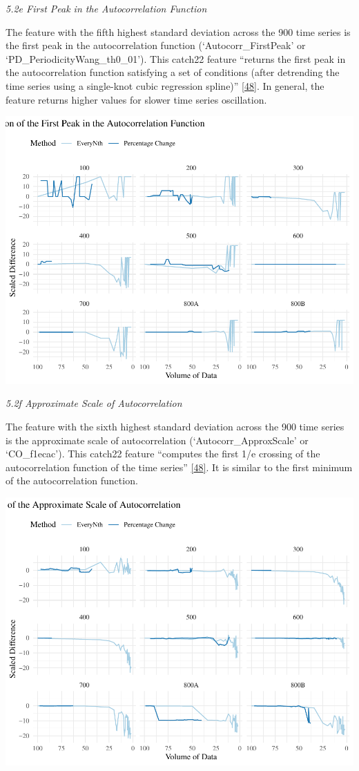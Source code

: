 \documentclass{article}
\begin{document}
\emph{5.2e First Peak in the Autocorrelation Function}

The feature with the fifth highest standard deviation across the 900
time series is the first peak in the autocorrelation function
(`Autocorr\_FirstPeak' or `PD\_PeriodicityWang\_th0\_01'). This catch22
feature ``returns the first peak in the autocorrelation function
satisfying a set of conditions (after detrending the time series using a
single-knot cubic regression spline)''
\protect\hyperlink{ref-feature_book}{{[}48{]}}. In general, the feature
returns higher values for slower time series oscillation.

\includegraphics{210431461_CSC8639_Dissertation_files/figure-latex/FirstPeak-1.pdf}

\emph{5.2f Approximate Scale of Autocorrelation}

The feature with the sixth highest standard deviation across the 900
time series is the approximate scale of autocorrelation
(`Autocorr\_ApproxScale' or `CO\_f1ecac'). This catch22 feature
``computes the first 1/e crossing of the autocorrelation function of the
time series'' \protect\hyperlink{ref-feature_book}{{[}48{]}}. It is
similar to the first minimum of the autocorrelation function.

\includegraphics{210431461_CSC8639_Dissertation_files/figure-latex/ApproxScale-1.pdf}
\end{document}
